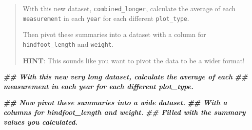 \documentclass[
  10pt,
  letterpaper,
  twoside,
  openright]{book}
\newenvironment{Shaded}{\begin{snugshade}}{\end{snugshade}}
\newcommand{\DocumentationTok}[1]{\textcolor[rgb]{0.56,0.35,0.01}{\textbf{\textit{#1}}}}
\begin{document}
\begin{quote}
With this new dataset, \texttt{combined\_longer}, calculate the average
of each \texttt{measurement} in each \texttt{year} for each different
\texttt{plot\_type}.

Then pivot these summaries into a dataset with a column for
\texttt{hindfoot\_length} and \texttt{weight}.

\textbf{HINT}: This sounds like you want to pivot the data to be a wider
format!
\end{quote}

\begin{Shaded}
\begin{Highlighting}[]
\DocumentationTok{\#\# With this new very long dataset, calculate the average of each }
\DocumentationTok{\#\# measurement in each year for each different plot\_type. }



\DocumentationTok{\#\# Now pivot these summaries into a wide dataset. }
\DocumentationTok{\#\# With a columns for hindfoot\_length and weight. }
\DocumentationTok{\#\# Filled with the summary values you calculated. }
\end{Highlighting}
\end{Shaded}


\backmatter
\end{document}
